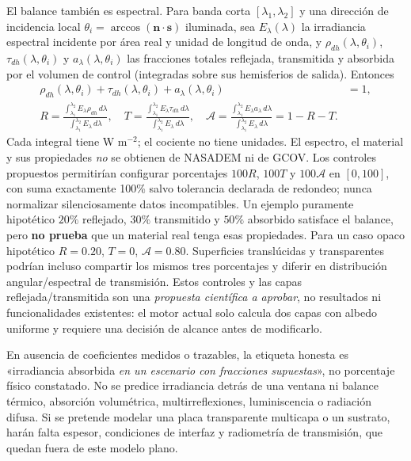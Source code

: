 \documentclass[11pt,a4paper]{article}
\begin{document}
El balance también es espectral. Para banda corta $[\lambda_1,\lambda_2]$ y una dirección de incidencia local $\theta_i=\arccos(\mathbf n\cdot\mathbf s)$ iluminada, sea $E_{\lambda}(\lambda)$ la irradiancia espectral incidente por área real y unidad de longitud de onda, y $\rho_{dh}(\lambda,\theta_i)$, $\tau_{dh}(\lambda,\theta_i)$ y $a_{\lambda}(\lambda,\theta_i)$ las fracciones totales reflejada, transmitida y absorbida por el volumen de control (integradas sobre sus hemisferios de salida). Entonces \cite{nisttrans,modis43}
\begin{align}
 \rho_{dh}(\lambda,\theta_i)+\tau_{dh}(\lambda,\theta_i)+a_{\lambda}(\lambda,\theta_i)&=1,\label{eq:spectral-balance}\\
 R=\frac{\int_{\lambda_1}^{\lambda_2}E_{\lambda}\rho_{dh}\,d\lambda}{\int_{\lambda_1}^{\lambda_2}E_{\lambda}\,d\lambda},\quad
 T=\frac{\int_{\lambda_1}^{\lambda_2}E_{\lambda}\tau_{dh}\,d\lambda}{\int_{\lambda_1}^{\lambda_2}E_{\lambda}\,d\lambda},\quad
 \mathcal A=\frac{\int_{\lambda_1}^{\lambda_2}E_{\lambda}a_{\lambda}\,d\lambda}{\int_{\lambda_1}^{\lambda_2}E_{\lambda}\,d\lambda}=1-R-T.\label{eq:spectral-albedo}
\end{align}
Cada integral tiene W m$^{-2}$; el cociente no tiene unidades. El espectro, el material y sus propiedades \emph{no} se obtienen de NASADEM ni de GCOV. Los controles propuestos permitirían configurar porcentajes $100R$, $100T$ y $100\mathcal A$ en $[0,100]$, con suma exactamente 100\% salvo tolerancia declarada de redondeo; nunca normalizar silenciosamente datos incompatibles. Un ejemplo puramente hipotético $20\%$ reflejado, $30\%$ transmitido y $50\%$ absorbido satisface el balance, pero \textbf{no prueba} que un material real tenga esas propiedades. Para un caso opaco hipotético $R=0.20$, $T=0$, $\mathcal A=0.80$. Superficies translúcidas y transparentes podrían incluso compartir los mismos tres porcentajes y diferir en distribución angular/espectral de transmisión. Estos controles y las capas reflejada/transmitida son una \emph{propuesta científica a aprobar}, no resultados ni funcionalidades existentes: el motor actual solo calcula dos capas con albedo uniforme y requiere una decisión de alcance antes de modificarlo.

En ausencia de coeficientes medidos o trazables, la etiqueta honesta es «irradiancia absorbida \emph{en un escenario con fracciones supuestas}», no porcentaje físico constatado. No se predice irradiancia detrás de una ventana ni balance térmico, absorción volumétrica, multirreflexiones, luminiscencia o radiación difusa. Si se pretende modelar una placa transparente multicapa o un sustrato, harán falta espesor, condiciones de interfaz y radiometría de transmisión, que quedan fuera de este modelo plano.
\end{document}
